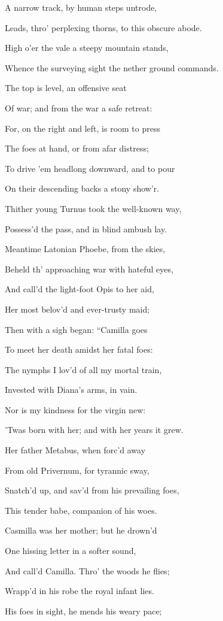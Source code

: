 A narrow track, by human steps untrode,

Leads, thro’ perplexing thorns, to this obscure abode.

High o’er the vale a steepy mountain stands,

Whence the surveying sight the nether ground commands.

The top is level, an offensive seat

Of war; and from the war a safe retreat:

For, on the right and left, is room to press

The foes at hand, or from afar distress;

To drive ’em headlong downward, and to pour

On their descending backs a stony show’r.

Thither young Turnus took the well-known way,

Possess’d the pass, and in blind ambush lay.

Meantime Latonian Phoebe, from the skies,

Beheld th’ approaching war with hateful eyes,

And call’d the light-foot Opis to her aid,

Her most belov’d and ever-trusty maid;

Then with a sigh began: “Camilla goes

To meet her death amidst her fatal foes:

The nymphs I lov’d of all my mortal train,

Invested with Diana’s arms, in vain.

Nor is my kindness for the virgin new:

’Twas born with her; and with her years it grew.

Her father Metabus, when forc’d away

From old Privernum, for tyrannic sway,

Snatch’d up, and sav’d from his prevailing foes,

This tender babe, companion of his woes.

Casmilla was her mother; but he drown’d

One hissing letter in a softer sound,

And call’d Camilla. Thro’ the woods he flies;

Wrapp’d in his robe the royal infant lies.

His foes in sight, he mends his weary pace;


